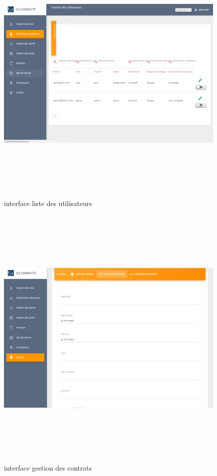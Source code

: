\documentclass{article}
\begin{document}
\begin{figure}[H]
\centering
\vspace*{0.8in}
\includegraphics[height=5.2in]{listeUtilisateur.PNG}
\caption[Figure19 : interface liste des utilisateurs ]{interface liste des  utilisateurs}
\label{fig:pic11}
\end{figure}

\begin{figure}[H]
\centering
\vspace*{0.8in}
\includegraphics[height=5.2in]{gestionContrat.PNG}
\caption[Figure20 : interface gestion des contrats ]{interface gestion des contrats}
\label{fig:pic12}
\end{figure}
\end{document}
